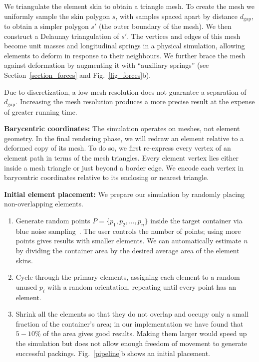 We triangulate the element skin to obtain a triangle mesh.
To create the mesh we uniformly sample the skin polygon $s$, with samples
spaced apart by distance $d_\mathrm{gap}$,
to obtain a simpler polygon $s'$ (the outer boundary of the mesh).
We then construct a Delaunay triangulation of $s'$.
The vertices and edges of this mesh become unit 
masses and longitudinal
springs in a physical simulation, allowing elements to deform in response to
their neighbours.  
We further brace the mesh against
deformation by augmenting it with ``auxiliary springs'' (see
Section~\ref{section_forces} and Fig.~\ref{fig_forces}b).

Due to discretization, a low mesh resolution does not guarantee a separation of $d_\mathrm{gap}$. 
Increasing the mesh resolution produces a more precise result at the expense of greater running time.

\textbf{Barycentric coordinates:}
The simulation operates on meshes, not element geometry.  In the final
rendering phase, we will redraw an element relative to a deformed copy of
its mesh.  To do so, we first re-express every vertex of an element path in 
terms of the mesh triangles.  Every element vertex lies either inside a mesh
triangle or just beyond a border edge.  We encode each vertex in barycentric
coordinates relative to its enclosing or nearest triangle.

\textbf{Initial element placement:}
We prepare our simulation by randomly placing non-overlapping elements.
\begin{enumerate}
	\item Generate random points $P = \{ p_1, p_2,..., p_n \}$ 
		  inside the target container 
	      via blue noise sampling~\cite{Bridson2007}.
	      The user controls the number of points; using more points gives results
	      with smaller elements.  We can automatically estimate $n$ by
		  dividing the container area by the desired average area of the element skins.
	\item Cycle through the primary elements, assigning each element to a 
		  random unused $p_i$ with a random orientation, repeating until 
		  every point has an element.
	\item Shrink all the elements so that they do not overlap and occupy only
		  a small fraction of the container's area; in our implementation we
		  have found that $5-10$\% of the area gives good results. Making them
		  larger would speed up the simulation but does
	      not allow enough freedom of movement to generate successful
		  packings.  Fig.~\ref{pipeline}b shows an initial placement.	      
\end{enumerate}



